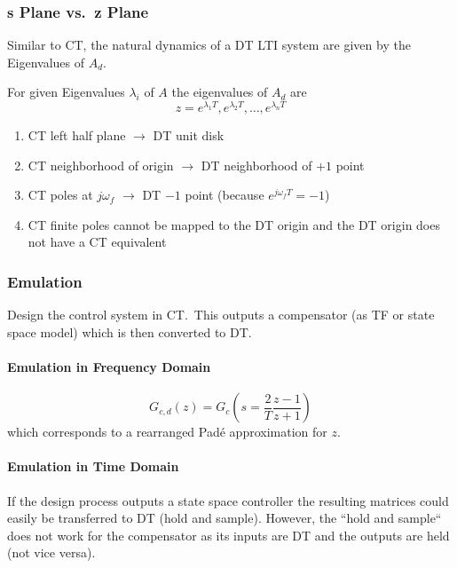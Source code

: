 \subsubsection{s Plane vs.\ z Plane}
Similar to CT, the natural dynamics of a DT LTI system are given by the Eigenvalues of $A_d$.

For given Eigenvalues $\lambda_i$ of $A$ the eigenvalues of $A_d$ are
\begin{equation*}
    z=e^{\lambda_1T},e^{\lambda_2T},\ldots,e^{\lambda_{n}T}
\end{equation*}

\begin{enumerate}
    \item CT left half plane $\rightarrow$ DT unit disk
    \item CT neighborhood of origin $\rightarrow$ DT neighborhood of $+1$ point
    \item CT poles at $j\omega_f$ $\rightarrow$ DT $-1$ point (because $e^{j\omega_{f}T}=-1$)
    \item CT finite poles cannot be mapped to the DT origin and the DT origin does not have a CT equivalent
\end{enumerate}

\subsubsection{Emulation}
Design the control system in CT.\ This outputs a compensator (as TF or state space model) which is then converted to DT.

\paragraph{Emulation in Frequency Domain}
\begin{equation*}
    G_{c,d}(z)=G_{c}\left(s=\frac2T\frac{z-1}{z+1}\right)
\end{equation*}
which corresponds to a rearranged Padé approximation for $z$.

\paragraph{Emulation in Time Domain}
If the design process outputs a state space controller the resulting matrices could easily be transferred to DT (hold and sample).
However, the ``hold and sample`` does not work for the compensator as its inputs are DT and the outputs are held (not vice versa).\\\\

